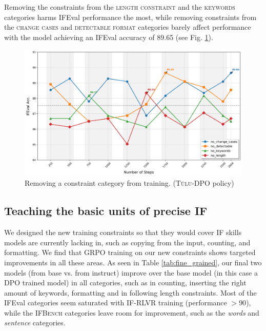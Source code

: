 \documentclass{article}
\newcommand{\benchname}{\textsc{IFBench}\xspace}
\newcommand{\tulu}{\textsc{T\"ulu}\xspace}
\begin{document}
Removing the constraints from the \textsc{length constraint} and the \textsc{keywords} categories harms IFEval performance the most, while removing constraints from the \textsc{change cases} and \textsc{detectable format} categories barely affect performance with the model achieving an IFEval accuracy of 89.65 (see Fig. \ref{fig:leave_one_out}).

\begin{figure}
  \begin{center}
    \centering
    \includegraphics[width=\linewidth]{figures/leave_one_out.png}
        \caption{Removing a constraint category from training. (\tulu-DPO policy)}
            \label{fig:leave_one_out}
\end{center}
\end{figure}

\subsection{Teaching the basic units of precise IF}
We designed the new training constraints so that they would cover IF skills models are currently lacking in, such as copying from the input, counting, and formatting. We find that GRPO training on our new constraints shows targeted improvements in all these areas. As seen in Table \ref{tab:fine_grained}, our final two models (from base vs. from instruct) improve over the base model (in this case a DPO trained model) in all categories, such as in counting, inserting the right amount of keywords, formatting and in following length constraints. Most of the IFEval categories seem saturated with IF-RLVR training (performance $>90$), while the \benchname categories leave room for improvement, such as the \textit{words} and \textit{sentence} categories.
\end{document}
